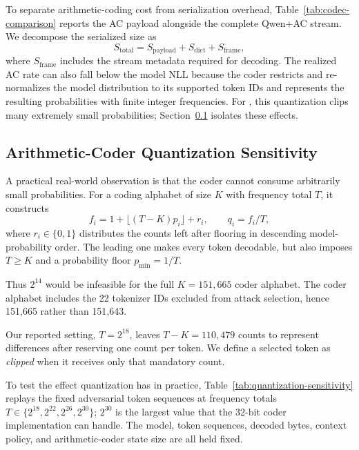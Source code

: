 \label{app:stream-accounting}
To separate arithmetic-coding cost from serialization overhead, Table~\ref{tab:codec-comparison} reports the AC payload alongside the complete Qwen+AC stream. We decompose the serialized size as
\[
S_{\mathrm{total}}
= S_{\mathrm{payload}} + S_{\mathrm{dict}} + S_{\mathrm{frame}},
\]
where $S_{\mathrm{frame}}$ includes the stream metadata required for decoding.
The realized AC rate can also fall below the model NLL because the coder
restricts and re-normalizes the model distribution to its supported token IDs
and represents the resulting probabilities with finite integer frequencies.
For \MinProb{}, this quantization clips many extremely small probabilities;
Section~\ref{app:quantization-sensitivity} isolates these effects.


\subsection{Arithmetic-Coder Quantization Sensitivity}
\label{app:quantization-sensitivity}
A practical real-world observation is that the coder cannot consume arbitrarily small probabilities. For a coding alphabet of size $K$ with frequency total $T$, it constructs
\begin{equation}
    f_i = 1 + \lfloor (T-K)p_i\rfloor + r_i, \qquad q_i=f_i/T,
\end{equation} \label{eq:quantization_floor}
where $r_i\in\{0,1\}$ distributes the counts left after flooring in
descending model-probability order. The leading one makes every token decodable, but also imposes $T\ge K$ and a probability floor $p_{\min}=1/T$.

Thus $2^{14}$ would be infeasible for the full $K=151{,}665$ coder alphabet. The coder alphabet includes the 22 tokenizer IDs excluded from attack selection, hence 151{,}665 rather than 151{,}643.

Our reported setting, $T=2^{18}$, leaves $T-K=110{,}479$ counts to represent differences after reserving one count per token. We define a selected token as \emph{clipped} when it receives only that mandatory count.

To test the effect quantization has in practice, Table~\ref{tab:quantization-sensitivity} replays the fixed adversarial token sequences at frequency totals $T\in\{2^{18},2^{22},2^{26},2^{30}\}$; $2^{30}$ is the largest value that the 32-bit coder implementation can handle. The model, token sequences, decoded bytes, context policy, and arithmetic-coder state size are all held fixed.

